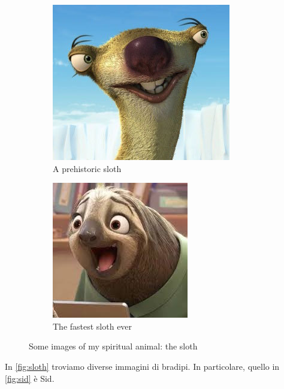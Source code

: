 \documentclass[a4paper,12pt,final]{article}
\begin{document}
\begin{figure}
		\begin{subfigure}{0.45\textwidth}
			\includegraphics[width=\textwidth]{SIdSloth}
			\caption{A prehistoric sloth}\label{fig:sid}
		\end{subfigure}
		\hfill
		\begin{subfigure}{0.45\textwidth}
			\includegraphics[width=\textwidth]{flash}
			\caption{The fastest sloth ever}
		\end{subfigure}
		\caption{Some images of my spiritual animal: the sloth}\label{fig:sloth}
	\end{figure}
	In \autoref{fig:sloth} troviamo diverse immagini di bradipi. In particolare, quello in \autoref{fig:sid} è Sid.
	
\end{document}
